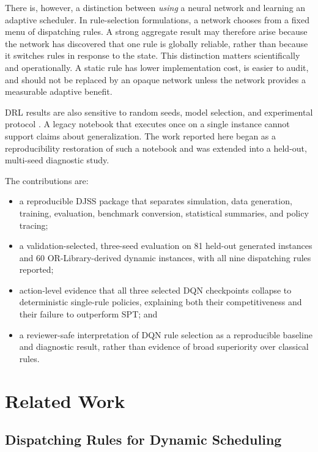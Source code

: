 \documentclass[conference]{IEEEtran}
\newcommand{\method}[1]{\textsc{#1}}
\newcommand{\dqn}{\method{DQN}}
\newcommand{\spt}{\method{SPT}}
\begin{document}
There is, however, a distinction between \emph{using} a neural network and learning an adaptive scheduler. In rule-selection formulations, a network chooses from a fixed menu of dispatching rules. A strong aggregate result may therefore arise because the network has discovered that one rule is globally reliable, rather than because it switches rules in response to the state. This distinction matters scientifically and operationally. A static rule has lower implementation cost, is easier to audit, and should not be replaced by an opaque network unless the network provides a measurable adaptive benefit.

DRL results are also sensitive to random seeds, model selection, and experimental protocol \cite{henderson2018matters}. A legacy notebook that executes once on a single instance cannot support claims about generalization. The work reported here began as a reproducibility restoration of such a notebook and was extended into a held-out, multi-seed diagnostic study.

The contributions are:

\begin{itemize}
    \item a reproducible DJSS package that separates simulation, data generation, training, evaluation, benchmark conversion, statistical summaries, and policy tracing;
    \item a validation-selected, three-seed evaluation on 81 held-out generated instances and 60 OR-Library-derived dynamic instances, with all nine dispatching rules reported;
    \item action-level evidence that all three selected \dqn{} checkpoints collapse to deterministic single-rule policies, explaining both their competitiveness and their failure to outperform \spt; and
    \item a reviewer-safe interpretation of \dqn{} rule selection as a reproducible baseline and diagnostic result, rather than evidence of broad superiority over classical rules.
\end{itemize}

\section{Related Work}

\subsection{Dispatching Rules for Dynamic Scheduling}
\end{document}
